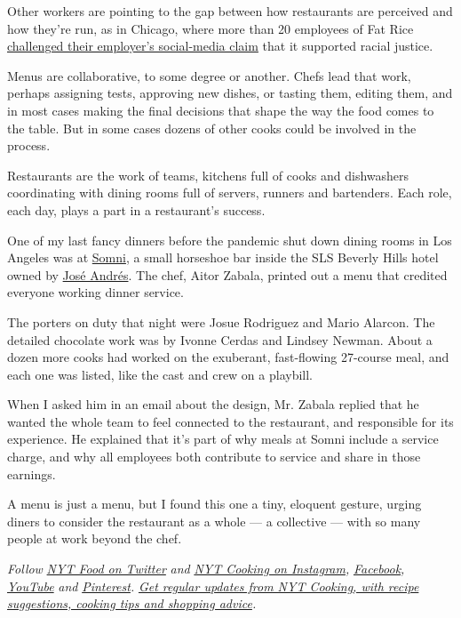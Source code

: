 Other workers are pointing to the gap between how restaurants are
perceived and how they're run, as in Chicago, where more than 20
employees of Fat Rice
\href{https://www.nytimes.com/2020/06/16/dining/fat-rice-chicago-abe-conlon-racism.html}{challenged
their employer's social-media claim} that it supported racial justice.

Menus are collaborative, to some degree or another. Chefs lead that
work, perhaps assigning tests, approving new dishes, or tasting them,
editing them, and in most cases making the final decisions that shape
the way the food comes to the table. But in some cases dozens of other
cooks could be involved in the process.

Restaurants are the work of teams, kitchens full of cooks and
dishwashers coordinating with dining rooms full of servers, runners and
bartenders. Each role, each day, plays a part in a restaurant's success.

One of my last fancy dinners before the pandemic shut down dining rooms
in Los Angeles was at \href{https://www.thebazaar.com/somni/}{Somni}, a
small horseshoe bar inside the SLS Beverly Hills hotel owned by
\href{https://www.nytimes.com/2017/10/30/dining/jose-andres-puerto-rico.html}{José
Andrés}. The chef, Aitor Zabala, printed out a menu that credited
everyone working dinner service.

The porters on duty that night were Josue Rodriguez and Mario Alarcon.
The detailed chocolate work was by Ivonne Cerdas and Lindsey Newman.
About a dozen more cooks had worked on the exuberant, fast-flowing
27-course meal, and each one was listed, like the cast and crew on a
playbill.

When I asked him in an email about the design, Mr. Zabala replied that
he wanted the whole team to feel connected to the restaurant, and
responsible for its experience. He explained that it's part of why meals
at Somni include a service charge, and why all employees both contribute
to service and share in those earnings.

A menu is just a menu, but I found this one a tiny, eloquent gesture,
urging diners to consider the restaurant as a whole --- a collective ---
with so many people at work beyond the chef.

\emph{Follow} \href{https://twitter.com/nytfood}{\emph{NYT Food on
Twitter}} \emph{and}
\href{https://www.instagram.com/nytcooking/}{\emph{NYT Cooking on
Instagram}}\emph{,}
\href{https://www.facebook.com/nytcooking/}{\emph{Facebook}}\emph{,}
\href{https://www.youtube.com/nytcooking}{\emph{YouTube}} \emph{and}
\href{https://www.pinterest.com/nytcooking/}{\emph{Pinterest}}\emph{.}
\href{https://www.nytimes.com/newsletters/cooking}{\emph{Get regular
updates from NYT Cooking, with recipe suggestions, cooking tips and
shopping advice}}\emph{.}

